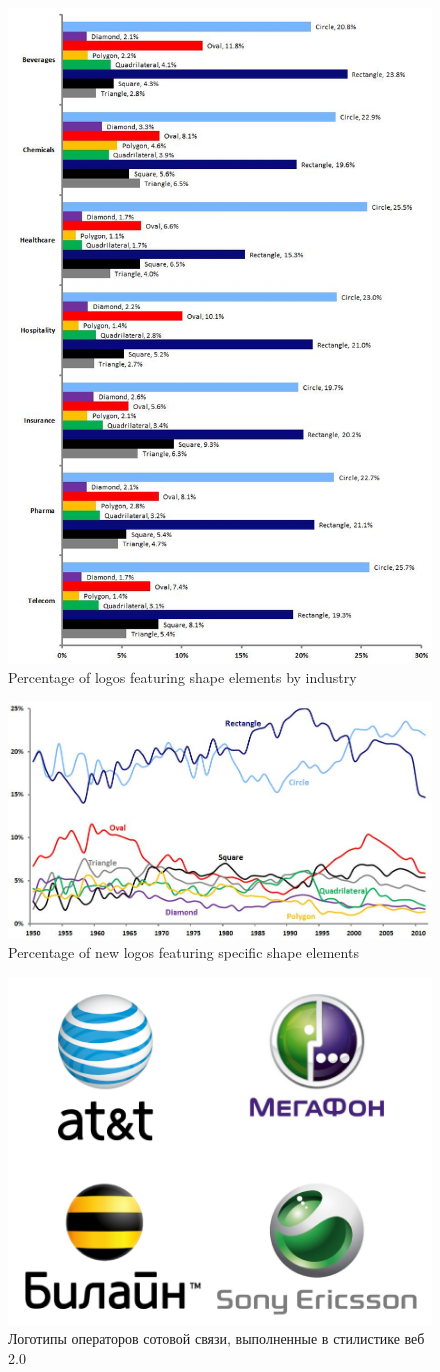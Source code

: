 \begin{figure}[ht]
  \centering
  \includegraphics[width=.5\linewidth]{images/supplement/emblemetrics/shapeindustry}
  \caption[]{Percentage of logos featuring shape elements by industry}
  \label{fig:emblemetrics:shape-industry}
\end{figure}

\begin{figure}[ht]
  \centering
  \includegraphics[width=.5\linewidth]{images/supplement/emblemetrics/shape}
  \caption[]{Percentage of new logos featuring specific shape elements}
  \label{fig:emblemetrics:shape}
\end{figure}

\begin{figure}[ht]
  \centering
  \includegraphics[width=.5\linewidth]{images/supplement/emblemetrics/web20}
  \caption[]{Логотипы операторов сотовой связи, выполненные в стилистике веб 2.0}
  \label{fig:emblemetrics:web20}
\end{figure}
